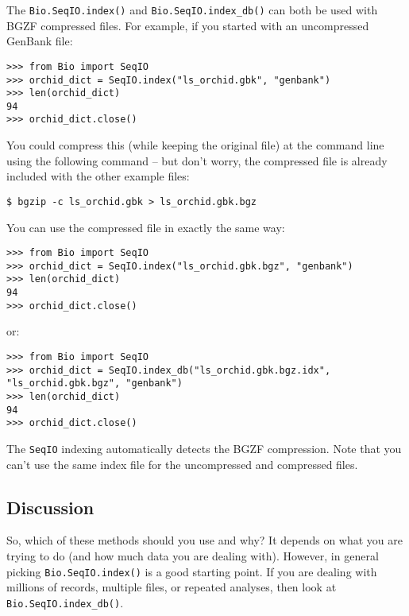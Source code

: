 The \verb|Bio.SeqIO.index()| and \verb|Bio.SeqIO.index_db()| can both be
used with BGZF compressed files. For example, if you started with an
uncompressed GenBank file:

\begin{verbatim}
>>> from Bio import SeqIO
>>> orchid_dict = SeqIO.index("ls_orchid.gbk", "genbank")
>>> len(orchid_dict)
94
>>> orchid_dict.close()
\end{verbatim}

You could compress this (while keeping the original file) at the command
line using the following command -- but don't worry, the compressed file
is already included with the other example files:

\begin{verbatim}
$ bgzip -c ls_orchid.gbk > ls_orchid.gbk.bgz
\end{verbatim}

You can use the compressed file in exactly the same way:

\begin{verbatim}
>>> from Bio import SeqIO
>>> orchid_dict = SeqIO.index("ls_orchid.gbk.bgz", "genbank")
>>> len(orchid_dict)
94
>>> orchid_dict.close()
\end{verbatim}

\noindent
or:

\begin{verbatim}
>>> from Bio import SeqIO
>>> orchid_dict = SeqIO.index_db("ls_orchid.gbk.bgz.idx", "ls_orchid.gbk.bgz", "genbank")
>>> len(orchid_dict)
94
>>> orchid_dict.close()
\end{verbatim}

The \verb|SeqIO| indexing automatically detects the BGZF compression. Note
that you can't use the same index file for the uncompressed and compressed files.

\subsection{Discussion}
\label{sec:SeqIO-indexing-discussion}

So, which of these methods should you use and why? It depends on what you are
trying to do (and how much data you are dealing with). However, in general
picking \verb|Bio.SeqIO.index()| is a good starting point. If you are dealing
with millions of records, multiple files, or repeated analyses, then look at
\verb|Bio.SeqIO.index_db()|.


